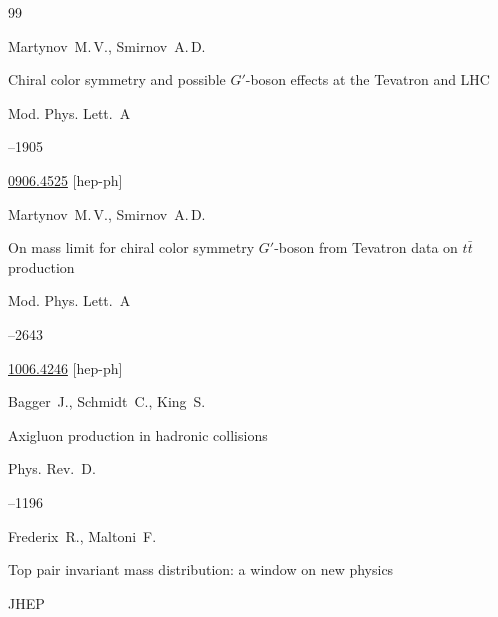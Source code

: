 \begin{thebibliography}{99}

\by Martynov~M.\,V., Smirnov~A.\,D.

\paper Chiral color symmetry and possible   $G'$-boson effects at the Tevatron and LHC

\jour Mod. Phys. Lett.~A




--1905

\arxiv \href{http://arxiv.org/abs/0906.4525}{0906.4525} [hep-ph]





\by Martynov~M.\,V., Smirnov~A.\,D.

\paper On mass limit for chiral color symmetry $G'$-boson from Tevatron data on $t \bar{t}$ production

\jour Mod. Phys. Lett.~A




--2643

\arxiv \href{http://arxiv.org/abs/1006.4246}{1006.4246} [hep-ph]







\by Bagger~J., Schmidt~C., King~S.

\paper Axigluon production in hadronic collisions

\jour Phys. Rev.~D.




–1196







\by Frederix~R., Maltoni~F.

\paper Top pair invariant mass distribution: a window on new physics

\jour JHEP


\end{thebibliography}
